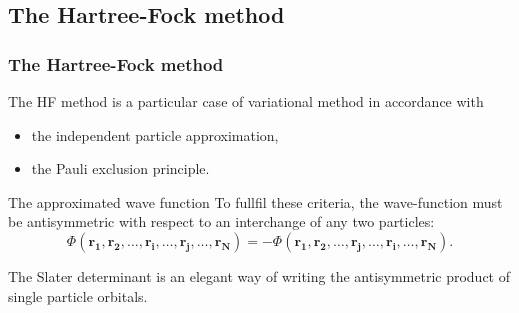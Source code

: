 \documentclass[xcolor=pdftex,hyperref={pdfpagelabels=false},table]{beamer}
\begin{document}
\subsection{The Hartree-Fock method}
\begin{frame}
\frametitle{The Hartree-Fock method}
\begin{footnotesize}
\begin{definition}
The HF method is a particular case of variational method in accordance with
\begin{itemize}
 \item the independent particle approximation,
\item the Pauli exclusion principle.
\end{itemize}
\end{definition}
\begin{alertblock}{The approximated wave function}
To fullfil these criteria, the wave-function must be antisymmetric with respect to an interchange of any two particles: \begin{equation}
\Phi(\mathbf{r_1},\mathbf{r_2},\dots,\mathbf{r_i},\dots, \mathbf{r_j},\dots,\mathbf{r_N})=-\Phi(\mathbf{r_1},\mathbf{r_2},\dots,\mathbf{r_j},\dots, \mathbf{r_i},\dots,\mathbf{r_N}).
\end{equation}

The Slater determinant is an elegant way of writing the antisymmetric product of single particle orbitals.
\end{alertblock}
\end{footnotesize}
\end{frame}
\end{document}
